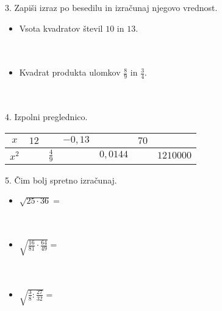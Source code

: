         \begin{frame}[t]
            \begin{alertblock}{3. Zapiši izraz po besedilu in izračunaj njegovo vrednost.}
                \begin{itemize}
                    \item Vsota kvadratov števil $10$ in $13$. \\ ~ \\ ~ \\
                    \item Kvadrat produkta ulomkov $\frac{8}{9}$ in $\frac{3}{4}$. \\ ~ \\ ~ \\
                \end{itemize}
            \end{alertblock}

            \begin{alertblock}{4. Izpolni preglednico.}
                \begin{table}[H]
                    \centering
                    \addtolength{\tabcolsep}{7pt}
                    \renewcommand{\arraystretch}{2}                
                    \begin{tabular}{||c||c|c|c|c|c|c||} 
                        \hline \hline
                                $x$ & $12$ & & $-0,13$ & & $70$ &  \\ 
                        \hline
                                $x^2$ & & $\frac{4}{9}$ & & $0,0144$ & & $1210000$  \\ 
                        \hline \hline
                    \end{tabular}
                \end{table}
            \end{alertblock}
        \end{frame}

        \begin{frame}[t]
            \begin{alertblock}{5. Čim bolj spretno izračunaj.}
                \begin{itemize}
                    \item $\sqrt{25\cdot 36}=$ \\ ~ \\ ~ \\
                    \item $\sqrt{\frac{16}{81}\cdot\frac{64}{49}}=$ \\ ~ \\ ~ \\
                    \item $\sqrt{\frac{3}{8}:\frac{27}{32}}=$ \\ ~ \\ ~ \\
                \end{itemize}
            \end{alertblock}
        \end{frame}

